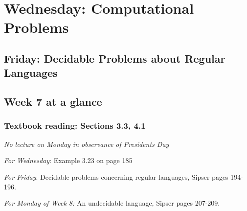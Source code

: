 \newpage

\section*{Wednesday: Computational Problems}


    
\newpage
\subsection*{Friday: Decidable Problems about Regular Languages}



\newpage

\subsection*{Week 7 at a glance}

\subsubsection*{Textbook reading: Sections 3.3, 4.1}

{\it No lecture on Monday in observance of Presidents Day}

{\it For Wednesday}: Example 3.23 on page 185

{\it For Friday}:  Decidable problems concerning regular languages, Sipser pages 194-196.

{\it For Monday of Week 8:} An undecidable language, Sipser pages 207-209.

